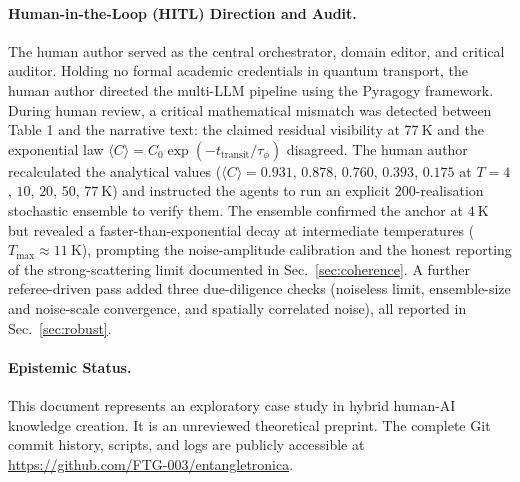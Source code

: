 \documentclass[11pt,a4paper]{article}
\begin{document}
\paragraph{Human-in-the-Loop (HITL) Direction and Audit.}
The human author served as the central orchestrator, domain editor, and critical auditor. Holding no formal academic credentials in quantum transport, the human author directed the multi-LLM pipeline using the Pyragogy framework. During human review, a critical mathematical mismatch was detected between Table 1 and the narrative text: the claimed residual visibility at $77~\mathrm{K}$ and the exponential law $\langle C \rangle = C_0 \exp(-t_{\mathrm{transit}}/\tau_\phi)$ disagreed. The human author recalculated the analytical values ($\langle C \rangle = 0.931$, $0.878$, $0.760$, $0.393$, $0.175$ at $T = 4$, $10$, $20$, $50$, $77~\mathrm{K}$) and instructed the agents to run an explicit 200-realisation stochastic ensemble to verify them. The ensemble confirmed the anchor at $4~\mathrm{K}$ but revealed a faster-than-exponential decay at intermediate temperatures ($T_{\max}\approx11~\mathrm{K}$), prompting the noise-amplitude calibration and the honest reporting of the strong-scattering limit documented in Sec.~\ref{sec:coherence}. A further referee-driven pass added three due-diligence checks (noiseless limit, ensemble-size and noise-scale convergence, and spatially correlated noise), all reported in Sec.~\ref{sec:robust}.

\paragraph{Epistemic Status.}
This document represents an exploratory case study in hybrid human-AI knowledge creation. It is an unreviewed theoretical preprint. The complete Git commit history, scripts, and logs are publicly accessible at \url{https://github.com/FTG-003/entangletronica}.
\end{document}

